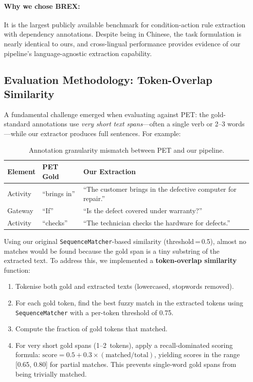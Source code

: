\documentclass[12pt,a4paper]{article}
\begin{document}
\paragraph{Why we chose BREX:} It is the largest publicly available benchmark for condition-action rule extraction with dependency annotations. Despite being in Chinese, the task formulation is nearly identical to ours, and cross-lingual performance provides evidence of our pipeline's language-agnostic extraction capability.

\subsection{Evaluation Methodology: Token-Overlap Similarity}
\label{sec:token-overlap}

A fundamental challenge emerged when evaluating against PET: the gold-standard annotations use \emph{very short text spans}---often a single verb or 2--3 words---while our extractor produces full sentences. For example:

\begin{table}[H]
\centering
\caption{Annotation granularity mismatch between PET and our pipeline.}
\label{tab:granularity-mismatch}
\begin{tabularx}{\textwidth}{l X X}
\toprule
\textbf{Element} & \textbf{PET Gold} & \textbf{Our Extraction} \\
\midrule
Activity & ``brings in'' & ``The customer brings in the defective computer for repair.'' \\
Gateway  & ``If'' & ``Is the defect covered under warranty?'' \\
Activity & ``checks'' & ``The technician checks the hardware for defects.'' \\
\bottomrule
\end{tabularx}
\end{table}

Using our original \texttt{SequenceMatcher}-based similarity (threshold\,=\,0.5), almost no matches would be found because the gold span is a tiny substring of the extracted text. To address this, we implemented a \textbf{token-overlap similarity} function:

\begin{enumerate}[leftmargin=2em]
    \item Tokenise both gold and extracted texts (lowercased, stopwords removed).
    \item For each gold token, find the best fuzzy match in the extracted tokens using \texttt{SequenceMatcher} with a per-token threshold of 0.75.
    \item Compute the fraction of gold tokens that matched.
    \item For very short gold spans (1--2~tokens), apply a recall-dominated scoring formula: $\text{score} = 0.5 + 0.3 \times (\text{matched}/\text{total})$, yielding scores in the range [0.65, 0.80] for partial matches. This prevents single-word gold spans from being trivially matched.
\end{enumerate}
\end{document}
